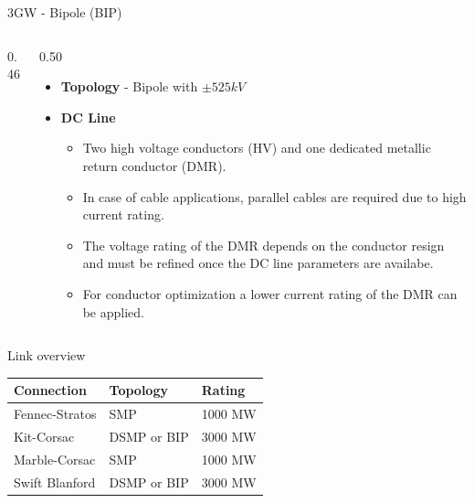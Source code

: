 \begin{frame}{3GW - Bipole (BIP)}
  \begin{columns}[c,onlytextwidth]
    \begin{column}{0.46\textwidth}
      \centering
    \end{column}
    \begin{column}{0.50\textwidth}
      \vspace{0.5em}
      \begin{itemize}
        \setlength{\itemsep}{0.7em}
        \item \textbf{Topology} - Bipole with $\pm525kV$
        \item \textbf{DC Line}
        \begin{itemize}
          \item Two high voltage conductors (HV) and one dedicated metallic return conductor (DMR).
          \item In case of cable applications, parallel cables are required due to high current rating.
          \item The voltage rating of the DMR depends on the conductor resign and must be refined once the DC line parameters are availabe.
          \item For conductor optimization a lower current rating of the DMR can be applied.
        \end{itemize}
      \end{itemize}
    \end{column}
  \end{columns}
\end{frame}


\begin{frame}{Link overview}
  \centering
  \renewcommand{\arraystretch}{1.3}
  \begin{tabular}{@{}lll@{}}
    \hline
    \textbf{Connection} & \textbf{Topology} & \textbf{Rating} \\
    \hline
    Fennec-Stratos & SMP & 1000 MW \\
    Kit-Corsac & DSMP or BIP & 3000 MW \\
    Marble-Corsac & SMP & 1000 MW \\
    Swift Blanford & DSMP or BIP & 3000 MW \\
    \hline
  \end{tabular}
\end{frame}



